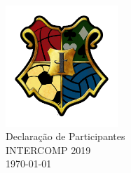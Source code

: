 \begin{center}

	\vspace*{\fill}
	{\let\clearpage\relax \includegraphics[width=120pt]{../logo-inter019.png} \\ [.5cm]}
	\Huge{Declaração de Participantes} \\ [.5cm]
	\Large{INTERCOMP 2019} \\ [.5cm]
	\normalsize{\today}
	\vspace*{\fill}

\end{center}

